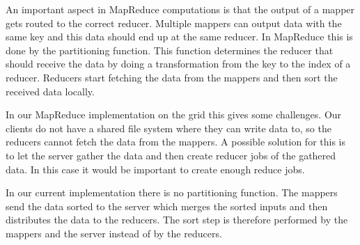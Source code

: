 An important aspect in MapReduce computations is that the output of a mapper
gets routed to the correct reducer.
Multiple mappers can output data with the same key and this data should end up
at the same reducer.
In MapReduce this is done by the partitioning function. This function determines
the reducer that should receive the data by doing a transformation from the key
to the index of a reducer. Reducers start fetching the data from the mappers and
then sort the received data locally.

In our MapReduce implementation on the grid this gives some challenges.
Our clients do not have a shared file system where they can write data to, so
the reducers cannot fetch the data from the mappers.
A possible solution for this is to let the server gather the data and then
create reducer jobs of the gathered data.
In this case it would be important to create enough reduce jobs.

In our current implementation there is no partitioning function. The mappers
send the data sorted to the server which merges the sorted inputs
and then distributes the data to the reducers. The sort step is therefore
performed by the mappers and the server instead of by the reducers.